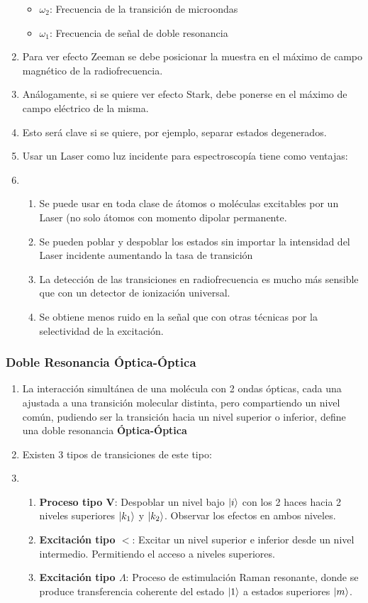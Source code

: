 \documentclass[aps,rmp,reprint,longbibliography]{revtex4-1}
\begin{document}
\begin{enumerate}
\begin{itemize}
    \item $\omega_2$: Frecuencia de la transición de microondas
    \item $\omega_1$: Frecuencia de señal de doble resonancia
\end{itemize}
\item Para ver efecto Zeeman se debe posicionar la muestra en el máximo de campo magnético de la radiofrecuencia. 
\item Análogamente, si se quiere ver efecto Stark, debe ponerse en el máximo de campo eléctrico de la misma. 
\item Esto será clave si se quiere, por ejemplo, separar estados degenerados.
\item Usar un Laser como luz incidente para espectroscopía tiene como ventajas:
\item 
\begin{enumerate}
    \item Se puede usar en toda clase de átomos o moléculas excitables por un Laser (no solo átomos con momento dipolar permanente.
    \item Se pueden poblar y despoblar los estados sin importar la intensidad del Laser incidente aumentando la tasa de transición
    \item La detección de las transiciones en radiofrecuencia es mucho más sensible que con un detector de ionización universal.
    \item Se obtiene menos ruido en la señal que con otras técnicas por la selectividad de la excitación. 
    \end{enumerate}
\end{enumerate}
\subsubsection{Doble Resonancia Óptica-Óptica}
\begin{enumerate}\item
La interacción simultánea de una molécula con 2 ondas ópticas, cada una ajustada a una transición molecular distinta, pero compartiendo un nivel común, pudiendo ser la transición hacia un nivel superior o inferior, define una doble resonancia \textbf{Óptica-Óptica}
\item Existen 3 tipos de transiciones de este tipo:
\item
\begin{enumerate}
    \item \textbf{Proceso tipo V}: Despoblar un nivel bajo $\ket{i}$ con los 2 haces hacia 2 niveles superiores $\ket{k_1}$ y $\ket{k_2}$. Observar los efectos en ambos niveles. 
    \item \textbf{Excitación tipo $<$}: Excitar un nivel superior e inferior desde un nivel intermedio. Permitiendo el acceso a niveles superiores.
    \item \textbf{Excitación tipo $\Lambda$}: Proceso de estimulación Raman resonante, donde se produce transferencia coherente del estado $\ket{1}$ a estados superiores $\ket{m}$.
\end{enumerate}
\end{enumerate}
\end{document}
